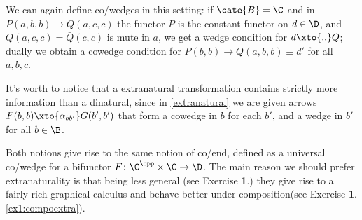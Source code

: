 \begin{remark}
We can again define co/wedges in this setting: if $\cate{B}=\C$ and in $P(a,b,b)\to Q(a,c,c)$ the functor $P$ is the constant functor on $d\in\D$, and $Q(a,c,c)=\bar Q(c,c)$ is mute in $a$, we get a wedge condition for $d\xto{..}Q$; dually we obtain a cowedge condition for $P(b,b)\to Q(a,b,b)\equiv d'$ for all $a,b,c$. 

It's worth to notice that a extranatural transformation contains strictly more information than a dinatural, since in \adef\ref{extranatural} we are given arrows $F(b,b) \xto{\alpha_{bb'}} G(b',b')$ that form a cowedge in $b$ for each $b'$, and a wedge in $b'$ for all $b\in\B$.
\end{remark}
Both notions give rise to the same notion of co/end, defined as a universal co/wedge for a bifunctor $F\colon \C^\opp\times\C\to \D$. The main reason we should prefer extranaturality is that being less general (see Exercise \textbf{1}.) they give rise to a fairly rich graphical calculus and behave better under composition(see Exercise \textbf{1}.\ref{ex1:compoextra}).


